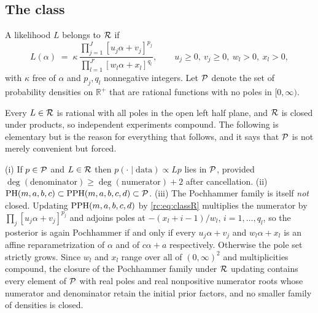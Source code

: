 \subsection{The class}

\begin{definition}\label{rc:def:class}
A likelihood $L$ belongs to $\mathcal{R}$ if
\begin{equation}\label{rc:eq:classR}
L(\alpha)\;=\;\kappa\,\frac{\prod_{j=1}^{J}[u_j\alpha+v_j]^{p_j}}{\prod_{l=1}^{J'}[w_l\alpha+x_l]^{q_l}},\qquad u_j\ge0,\ v_j\ge0,\ w_l>0,\ x_l>0,
\end{equation}
with $\kappa$ free of $\alpha$ and $p_j,q_l$ nonnegative integers. Let $\mathcal{P}$ denote the set of probability densities on $\mathbb{R}^+$ that are rational functions with no poles in $[0,\infty)$.
\end{definition}

Every $L\in\mathcal{R}$ is rational with all poles in the open left half plane, and $\mathcal{R}$ is closed under products, so independent experiments compound. The following is elementary but is the reason for everything that follows, and it says that $\mathcal{P}$ is not merely convenient but forced.

\begin{proposition}\label{rc:prop:conj}
(i) If $p\in\mathcal{P}$ and $L\in\mathcal{R}$ then $p(\cdot\mid\text{data})\propto Lp$ lies in $\mathcal{P}$, provided $\deg(\text{denominator})\ge\deg(\text{numerator})+2$ after cancellation. (ii) $\mathrm{PH}(m,a,b,c)\subset\mathrm{PPH}(m,a,b,c,d)\subset\mathcal{P}$. (iii) The Pochhammer family is itself \emph{not} closed. Updating $\mathrm{PPH}(m,a,b,c,d)$ by \eqref{rc:eq:classR} multiplies the numerator by $\prod_j[u_j\alpha+v_j]^{p_j}$ and adjoins poles at $-(x_l+i-1)/w_l$, $i=1,\dots,q_l$, so the posterior is again Pochhammer if and only if every $u_j\alpha+v_j$ and $w_l\alpha+x_l$ is an affine reparametrization of $\alpha$ and of $c\alpha+a$ respectively. Otherwise the pole set strictly grows. Since $w_l$ and $x_l$ range over all of $(0,\infty)^2$ and multiplicities compound, the closure of the Pochhammer family under $\mathcal{R}$ updating contains every element of $\mathcal{P}$ with real poles and real nonpositive numerator roots whose numerator and denominator retain the initial prior factors, and no smaller family of densities is closed.
\end{proposition}

